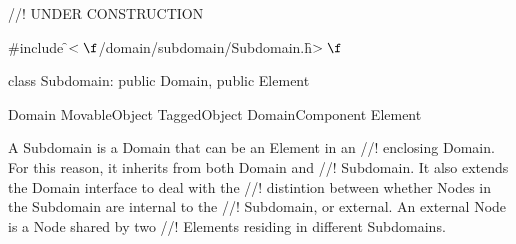 
//! UNDER CONSTRUCTION

\indent \#include \f$<\f$/domain/subdomain/Subdomain.h\f$>\f$

\indent class Subdomain: public Domain, public Element

\indent  Domain 
\indent MovableObject
\indent TaggedObject
\indent\indent DomainComponent
\indent\indent\indent  Element
\indent\indent\indent{}

\indent  A Subdomain is a Domain that can be an Element in an
//! enclosing Domain. For this reason, it inherits from both Domain and
//! Subdomain. It also extends the Domain interface to deal with the
//! distintion between whether Nodes in the Subdomain are internal to the
//! Subdomain, or external. An external Node is a Node shared by two
//! Elements residing in different Subdomains.


